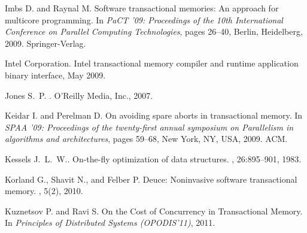 \begin{thebibliography}{99}
{%




Imbs D. and Raynal M.
\newblock Software transactional memories: An approach for multicore
  programming.
\newblock In {\em PaCT '09: Proceedings of the 10th International Conference on
  Parallel Computing Technologies}, pages 26--40, Berlin, Heidelberg, 2009.
  Springer-Verlag.



{Intel Corporation}.
\newblock Intel transactional memory compiler and runtime application binary
  interface, May 2009.



Jones S.~P.
.
\newblock O'Reilly Media, Inc., 2007.





Keidar I. and Perelman D.
\newblock On avoiding spare aborts in transactional memory.
\newblock In {\em SPAA '09: Proceedings of the twenty-first annual symposium on
  Parallelism in algorithms and architectures}, pages 59--68, New York, NY,
  USA, 2009. ACM.


Kessels J.~L.~W..
\newblock On-the-fly optimization of data structures.
, 26:895--901, 1983.






Korland G., Shavit N., and Felber P.
\newblock Deuce: Noninvasive software transactional memory.
, 5(2), 2010.



Kuznetsov P. and Ravi S.
\newblock On the Cost of Concurrency in Transactional Memory.
\newblock In {\em Principles of Distributed Systems (OPODIS'11)}, 2011.




}
\end{thebibliography}
